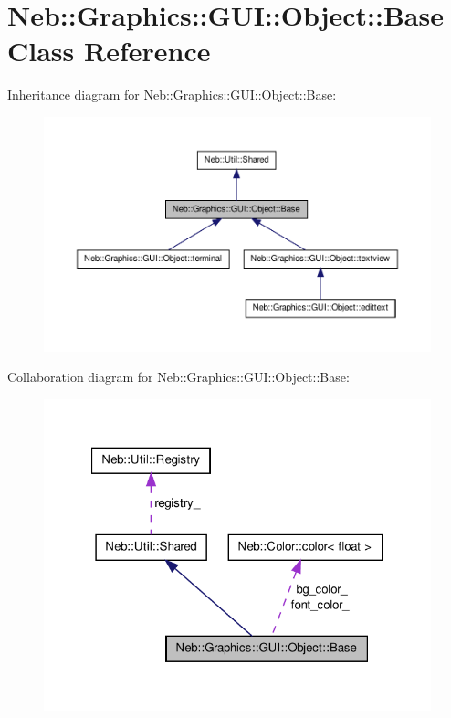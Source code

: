 \hypertarget{classNeb_1_1Graphics_1_1GUI_1_1Object_1_1Base}{\section{\-Neb\-:\-:\-Graphics\-:\-:\-G\-U\-I\-:\-:\-Object\-:\-:\-Base \-Class \-Reference}
\label{classNeb_1_1Graphics_1_1GUI_1_1Object_1_1Base}
}


\-Inheritance diagram for \-Neb\-:\-:\-Graphics\-:\-:\-G\-U\-I\-:\-:\-Object\-:\-:\-Base\-:\nopagebreak
\begin{figure}[H]
\begin{center}
\leavevmode
\includegraphics[width=350pt]{classNeb_1_1Graphics_1_1GUI_1_1Object_1_1Base__inherit__graph}
\end{center}
\end{figure}


\-Collaboration diagram for \-Neb\-:\-:\-Graphics\-:\-:\-G\-U\-I\-:\-:\-Object\-:\-:\-Base\-:\nopagebreak
\begin{figure}[H]
\begin{center}
\leavevmode
\includegraphics[width=321pt]{classNeb_1_1Graphics_1_1GUI_1_1Object_1_1Base__coll__graph}
\end{center}
\end{figure}
